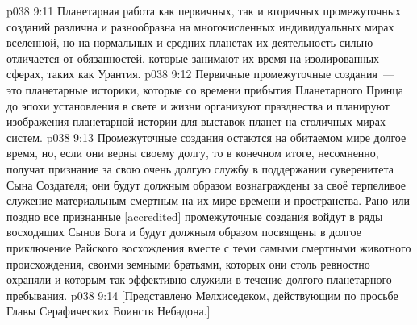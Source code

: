 \vs p038 9:11 Планетарная работа как первичных, так и вторичных промежуточных созданий различна и разнообразна на многочисленных индивидуальных мирах вселенной, но на нормальных и средних планетах их деятельность сильно отличается от обязанностей, которые занимают их время на изолированных сферах, таких как Урантия.
\vs p038 9:12 Первичные промежуточные создания~--- это планетарные историки, которые со времени прибытия Планетарного Принца до эпохи установления в свете и жизни организуют празднества и планируют изображения планетарной истории для выставок планет на столичных мирах систем.
\vs p038 9:13 \pc Промежуточные создания остаются на обитаемом мире долгое время, но, если они верны своему долгу, то в конечном итоге, несомненно, получат признание за свою очень долгую службу в поддержании суверенитета Сына Создателя; они будут должным образом вознаграждены за своё терпеливое служение материальным смертным на их мире времени и пространства. Рано или поздно все признанные [accredited] промежуточные создания войдут в ряды восходящих Сынов Бога и будут должным образом посвящены в долгое приключение Райского восхождения вместе с теми самыми смертными животного происхождения, своими земными братьями, которых они столь ревностно охраняли и которым так эффективно служили в течение долгого планетарного пребывания.
\vsetoff
\vs p038 9:14 [Представлено Мелхиседеком, действующим по просьбе Главы Серафических Воинств Небадона.]
\quizlink
